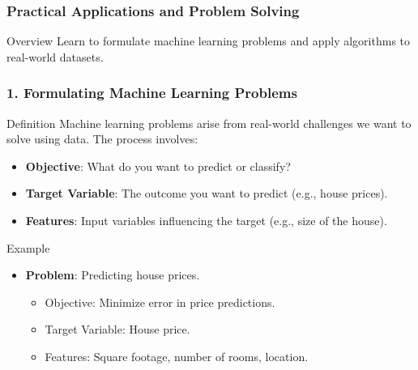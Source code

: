 \documentclass{beamer}
\begin{document}
\begin{frame}
    \frametitle{Practical Applications and Problem Solving}
    \begin{block}{Overview}
        Learn to formulate machine learning problems and apply algorithms to real-world datasets.
    \end{block}
\end{frame}

\begin{frame}
    \frametitle{1. Formulating Machine Learning Problems}
    \begin{block}{Definition}
        Machine learning problems arise from real-world challenges we want to solve using data. The process involves:
    \end{block}
    
    \begin{itemize}
        \item \textbf{Objective}: What do you want to predict or classify?
        \item \textbf{Target Variable}: The outcome you want to predict (e.g., house prices).
        \item \textbf{Features}: Input variables influencing the target (e.g., size of the house).
    \end{itemize}
    
    \begin{block}{Example}
        \begin{itemize}
            \item \textbf{Problem}: Predicting house prices.
            \begin{itemize}
                \item Objective: Minimize error in price predictions.
                \item Target Variable: House price.
                \item Features: Square footage, number of rooms, location.
            \end{itemize}
        \end{itemize}
    \end{block}
\end{frame}
\end{document}
